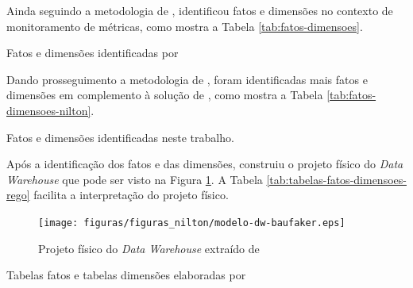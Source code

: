 	
Ainda seguindo a metodologia de \cite{Kimball2002},  identificou fatos e dimensões no contexto de monitoramento de métricas, como mostra a Tabela \ref{tab:fatos-dimensoes}. 

\begin{table}[!ht]
	\begin{center}
	
	 
	\caption{Fatos e dimensões identificadas por }
	\label{tab:fatos-dimensoes}
	\end{center}
	\end{table}	
	\FloatBarrier

Dando prosseguimento a metodologia de \cite{Kimball2002}, foram identificadas mais fatos e dimensões em complemento à solução de , como mostra a Tabela \ref{tab:fatos-dimensoes-nilton}. 

\begin{table}[!ht]
	\begin{center}
	
	 
	\caption{Fatos e dimensões identificadas neste trabalho.}
	\label{tab:fatos-dimensoes-nilton}
	\end{center}
	\end{table}	
	\FloatBarrier 

Após a identificação dos fatos e das dimensões,  construiu o projeto físico do \textit{Data Warehouse} que pode ser visto na Figura \ref{fig:arquitetura_solucao}. A Tabela \ref{tab:tabelas-fatos-dimensoes-rego} facilita a interpretação do projeto físico.

\begin{figure}[h!]
\centering
\texttt{[image: figuras/figuras\_nilton/modelo-dw-baufaker.eps]}
\caption{Projeto físico do \textit{Data Warehouse} extraído de }
\label{fig:arquitetura_solucao}
\end{figure}
\FloatBarrier

\begin{table}[!ht]
	\begin{center}
	
	 
	\caption{Tabelas fatos e tabelas dimensões elaboradas por }
	\label{tab:tabelas-fatos-dimensoes-rego}
	\end{center}
	\end{table}	
	\FloatBarrier
	
